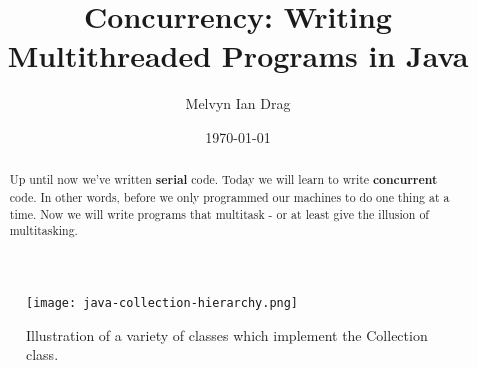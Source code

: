 \documentclass[12pt]{article}
\title{Concurrency: Writing Multithreaded Programs in Java}
\author{
	Melvyn Ian Drag
}
\date{\today}
\begin{document}
\maketitle

\begin{abstract}
Up until now we've written \textbf{serial} code. Today we will learn to write
\textbf{concurrent} code. In other words, before we only programmed our machines
to do one thing at a time. Now we will write programs that multitask - or at
least give the illusion of multitasking.
\end{abstract}

\section{}


\begin{figure}[h]
  \centering
    \texttt{[image: java-collection-hierarchy.png]}
  \caption{Illustration of a variety of classes which implement the Collection class.}
\end{figure}
\end{document}
